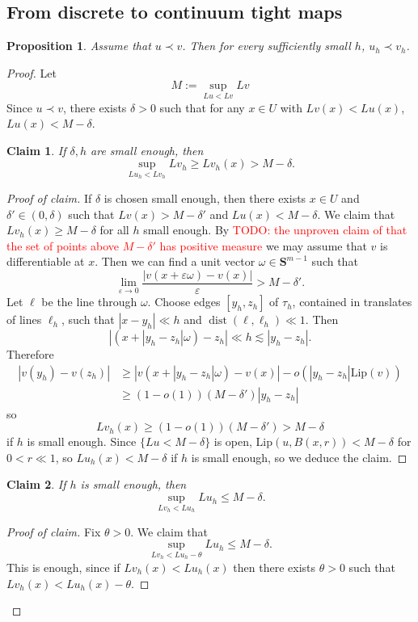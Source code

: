 \documentclass[reqno,11pt]{amsart}
\newcommand{\Sph}{\mathbf S}
\DeclareMathOperator{\dist}{dist}
\newcommand{\Lip}{\mathrm{Lip}}
\newtheorem{proposition}[theorem]{Proposition}
\newtheorem{claim}{Claim}[theorem]
\theoremstyle{definition}
\numberwithin{equation}{section}
\newcommand\todo[1]{\textcolor{red}{TODO: #1}}
\begin{document}
\subsection{From discrete to continuum tight maps}
\begin{proposition}
Assume that $u \prec v$.
Then for every sufficiently small $h$, $u_h \prec v_h$.
\end{proposition}
\begin{proof}
Let 
$$M := \sup_{Lu < Lv} Lv$$
Since $u \prec v$, there exists $\delta > 0$ such that for any $x \in U$ with $Lv(x) < Lu(x)$, $Lu(x) < M - \delta$.

\begin{claim}
If $\delta, h$ are small enough, then 
$$\sup_{Lu_h < Lv_h} Lv_h \geq Lv_h(x) > M - \delta.$$
\end{claim}
\begin{proof}[Proof of claim]
If $\delta$ is chosen small enough, then there exists $x \in U$ and $\delta' \in (0, \delta)$ such that $Lv(x) > M - \delta'$ and $Lu(x) < M - \delta$.
We claim that $Lv_h(x) \geq M - \delta$ for all $h$ small enough. 
By \todo{the unproven claim of \cite[\S1.4]{Sheffield12} that the set of points above $M - \delta'$ has positive measure} we may assume that $v$ is differentiable at $x$.
Then we can find a unit vector $\omega \in \Sph^{m - 1}$ such that 
$$\lim_{\varepsilon \to 0} \frac{|v(x + \varepsilon \omega) - v(x)|}{\varepsilon} > M - \delta'.$$
Let $\ell$ be the line through $\omega$.
Choose edges $[y_h, z_h]$ of $\tau_h$, contained in translates of lines $\ell_h$, such that $|x - y_h| \ll h$ and $\dist(\ell, \ell_h) \ll 1$.
Then
$$|(x + |y_h - z_h| \omega) - z_h| \ll h \lesssim |y_h - z_h|.$$
Therefore 
\begin{align*}
|v(y_h) - v(z_h)| &\geq |v(x + |y_h - z_h| \omega) - v(x)| - o(|y_h - z_h| \Lip(v)) \\
&\geq (1 - o(1))(M - \delta') |y_h - z_h|
\end{align*}
so 
$$Lv_h(x) \geq (1 - o(1))(M - \delta') > M - \delta$$
if $h$ is small enough.
Since $\{Lu < M - \delta\}$ is open, $\Lip(u, B(x, r)) < M - \delta$ for $0 < r \ll 1$, so $Lu_h(x) < M - \delta$ if $h$ is small enough, so we deduce the claim.
\end{proof}

\begin{claim}
If $h$ is small enough, then 
$$\sup_{Lv_h < Lu_h} Lu_h \leq M - \delta.$$
\end{claim}
\begin{proof}[Proof of claim]
Fix $\theta > 0$. We claim that 
\begin{equation}\label{loss of theta}
\sup_{Lv_h < Lu_h - \theta} Lu_h \leq M - \delta.
\end{equation}
This is enough, since if $Lv_h(x) < Lu_h(x)$ then there exists $\theta > 0$ such that $Lv_h(x) < Lu_h(x) - \theta$.


\end{proof}
\end{proof}
\end{document}
